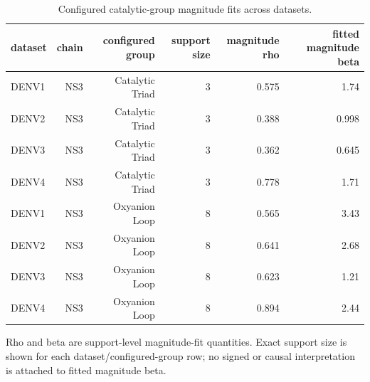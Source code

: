 \begin{table}[t]
  \centering
  \caption{Configured catalytic-group magnitude fits across datasets.}
  \label{tab:configured_catalytic}
  \begin{tabular}{lrrrrr}
    \toprule
    dataset & chain & configured group & support size & magnitude rho & fitted magnitude beta \\
    \midrule
    DENV1 & NS3 & Catalytic Triad & 3 & 0.575 & 1.74 \\
    DENV2 & NS3 & Catalytic Triad & 3 & 0.388 & 0.998 \\
    DENV3 & NS3 & Catalytic Triad & 3 & 0.362 & 0.645 \\
    DENV4 & NS3 & Catalytic Triad & 3 & 0.778 & 1.71 \\
    DENV1 & NS3 & Oxyanion Loop & 8 & 0.565 & 3.43 \\
    DENV2 & NS3 & Oxyanion Loop & 8 & 0.641 & 2.68 \\
    DENV3 & NS3 & Oxyanion Loop & 8 & 0.623 & 1.21 \\
    DENV4 & NS3 & Oxyanion Loop & 8 & 0.894 & 2.44 \\
    \bottomrule
  \end{tabular}
  \par\smallskip
  \begin{minipage}{0.98\linewidth}\footnotesize
  Rho and beta are support-level magnitude-fit quantities. Exact support size is shown for each dataset/configured-group row; no signed or causal interpretation is attached to fitted magnitude beta.
  \end{minipage}
\end{table}
